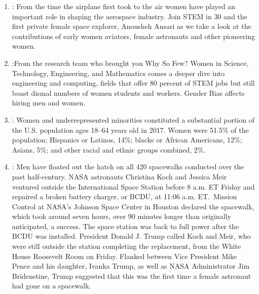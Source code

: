 \documentclass[12pt,a4paper]{article}
\begin{document}
  \clearpage
  \begin{center}
    \large{}
  \end{center}
  \begin{enumerate}
    \item {}: From the time the airplane first took to the air women have played an important role in shaping the aerospace industry. Join STEM in 30 and the first private female space explorer, Anousheh Ansari as we take a look at the contributions of early women aviators, female astronauts and other pioneering women. \href{https://www.youtube.com/watch?v=p12jUNsx5e0&feature=youtu.be}{}
    \item {}:From the research team who brought you Why So Few? Women in Science, Technology, Engineering, and Mathematics comes a deeper dive into engineering and computing, fields that offer 80 percent of STEM jobs but still boast dismal numbers of women students and workers. Gender Bias affects hiring men and women. \href{https://www.youtube.com/watch?v=FKaOGuzhbM8#action=share}{}
    \item {}: Women and underrepresented minorities constituted a substantial portion of the U.S. population ages 18–64 years old in 2017. Women were 51.5\% of the population; Hispanics or Latinos, 14\%; blacks or African Americans, 12\%; Asians, 5\%; and other racial and ethnic groups combined, 2\%. \href{https://ncses.nsf.gov/pubs/nsf19304/digest/introduction}{}
    \item {}: Men have floated out the hatch on all 420 spacewalks conducted over the past half-century. NASA astronauts Christina Koch and Jessica Meir ventured outside the International Space Station before 8 a.m. ET Friday and repaired a broken battery charger, or BCDU, at 11:06 a.m. ET.\ Mission Control at NASA's Johnson Space Center in Houston declared the spacewalk, which took around seven hours, over 90 minutes longer than originally anticipated, a success. The space station was back to full power after the BCDU was installed. President Donald J. Trump called Koch and Meir, who were still outside the station completing the replacement, from the White House Roosevelt Room on Friday. Flanked between Vice President Mike Pence and his daughter, Ivanka Trump, as well as NASA Administrator Jim Bridenstine, Trump suggested that this was the first time a female astronaut had gone on a spacewalk. \href{https://www.usatoday.com/story/news/nation/2019/10/18/nasa-astronauts-international-space-station-first-all-female-spacewalk/4020056002/}{}
  \end{enumerate}
\end{document}
